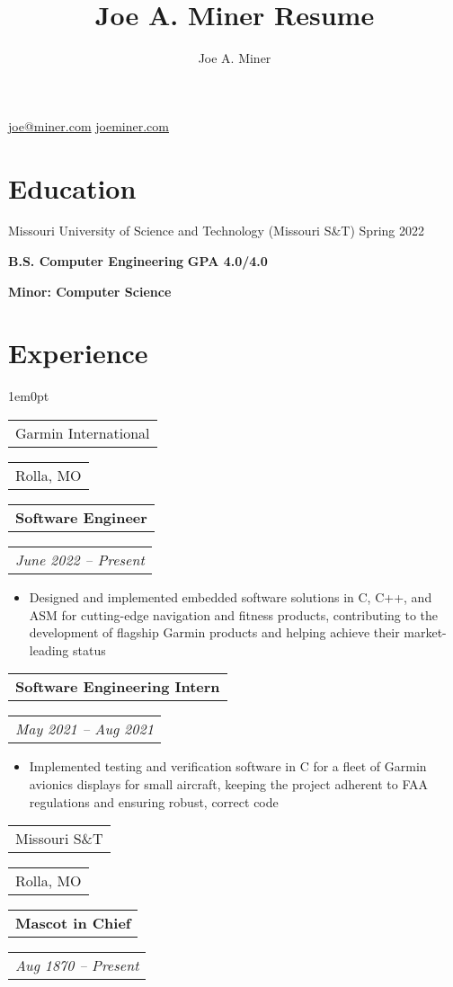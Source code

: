 \documentclass{article}
\makeatletter
\def\indentamount{1em}
\renewcommand{\maketitle}{
    \begin{center}
    {\huge\bfseries\theauthor}

    \vspace{.6em}

    \href{mailto:joe@miner.com}{joe@miner.com} 
    \quad
    \href{https://joeminer.com}{joeminer.com}

    \vspace{-.8em}
    \end{center}
}
\newcommand{\getsubsection}[2]{
    \noindent
    \begin{tabular}[t]{@{}l} 
        \large{#1}
    \end{tabular}
    \hfill
    \begin{tabular}[t]{l@{}}
        #2
    \end{tabular}
}
\newcommand{\getsubsubsection}[2]{
    \noindent
    \begin{tabular}[t]{@{}l} 
        \textbf{#1}
    \end{tabular}
    \hfill
    \begin{tabular}[t]{l@{}}
        \emph{#2}
    \end{tabular}
}
\newenvironment{ul}{
    \begin{itemize}[topsep=\parskip, partopsep=\parskip]
    \itemsep-.12em
    \let\olditem\item
    \renewcommand\item{\olditem}
}{
    \vspace{.45em}
    \end{itemize}
}
\makeatother
\begin{document}
\title{Joe A. Miner Resume}
\author{Joe A. Miner}

\maketitle

\section{Education}

Missouri University of Science and Technology (Missouri S\&T) 
\hfill
Spring 2022

\textbf{B.S. Computer Engineering}
\hfill
\textbf{GPA 4.0/4.0}

\textbf{Minor: Computer Science}

\section{Experience}

\begin{adjustwidth}{\indentamount}{0pt}

\getsubsection{Garmin International}{Rolla, MO}

\getsubsubsection{Software Engineer}{June 2022 -- Present}

\begin{ul}
    \item{Designed and implemented embedded software solutions in C, C++, and ASM for cutting-edge navigation and fitness products, contributing to the development of flagship Garmin products and helping achieve their market-leading status}
    \vspace{-1.7em}
\end{ul}

\getsubsubsection{Software Engineering Intern}{May 2021 -- Aug 2021}

\begin{ul}
    \item{Implemented testing and verification software in C for a fleet of Garmin avionics displays for small aircraft, keeping the project adherent to FAA regulations and ensuring robust, correct code}
\end{ul}

\end{adjustwidth}

\getsubsection{Missouri S\&T}{Rolla, MO}

\getsubsubsection{Mascot in Chief}{Aug 1870 -- Present}
\end{document}
